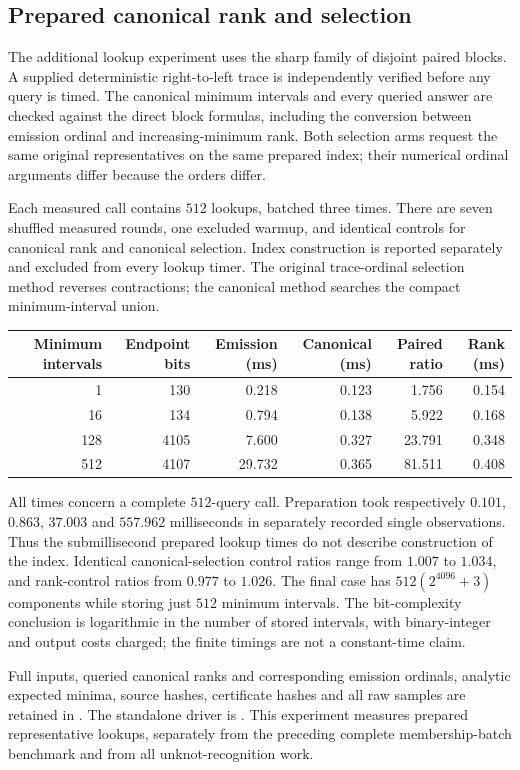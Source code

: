\subsection{Prepared canonical rank and selection}

The additional lookup experiment uses the sharp family of disjoint paired
blocks.  A supplied deterministic right-to-left trace is independently
verified before any query is timed.  The canonical minimum intervals and
every queried answer are checked against the direct block formulas, including
the conversion between emission ordinal and increasing-minimum rank.  Both
selection arms request the same original representatives on the same prepared
index; their numerical ordinal arguments differ because the orders differ.

Each measured call contains $512$ lookups, batched three times.  There are
seven shuffled measured rounds, one excluded warmup, and identical controls
for canonical rank and canonical selection.  Index construction is reported
separately and excluded from every lookup timer.  The original trace-ordinal
selection method reverses contractions; the canonical method searches the
compact minimum-interval union.

\begin{center}
\begin{tabular}{rrrrrr}
\hline
Minimum intervals & Endpoint bits & Emission (ms) & Canonical (ms)
 & Paired ratio & Rank (ms)\\
\hline
1 & 130 & 0.218 & 0.123 & 1.756 & 0.154\\
16 & 134 & 0.794 & 0.138 & 5.922 & 0.168\\
128 & 4105 & 7.600 & 0.327 & 23.791 & 0.348\\
512 & 4107 & 29.732 & 0.365 & 81.511 & 0.408\\
\hline
\end{tabular}
\end{center}

All times concern a complete $512$-query call.  Preparation took respectively
$0.101$, $0.863$, $37.003$ and $557.962$ milliseconds in separately recorded
single observations.  Thus the submillisecond prepared lookup times do not
describe construction of the index.  Identical canonical-selection control
ratios range from $1.007$ to $1.034$, and rank-control ratios from $0.977$ to
$1.026$.  The final case has $512(2^{4096}+3)$ components while storing just
$512$ minimum intervals.  The bit-complexity conclusion is logarithmic in
the number of stored intervals, with binary-integer and output costs charged;
the finite timings are not a constant-time claim.

Full inputs, queried canonical ranks and corresponding emission ordinals,
analytic expected minima, source hashes, certificate hashes and all raw
samples are retained in .  The standalone
driver is .  This experiment measures
prepared representative lookups, separately from the preceding complete
membership-batch benchmark and from all unknot-recognition work.
